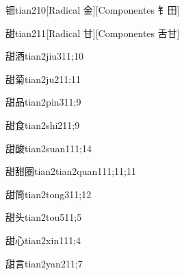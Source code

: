 \begin{verbete}{钿}{tian2}{10}[Radical 金][Componentes ⻐田]
\end{verbete}

\begin{verbete}{甜}{tian2}{11}[Radical 甘][Componentes 舌甘]
\end{verbete}

\begin{verbete}{甜酒}{tian2jiu3}{11;10}
\end{verbete}

\begin{verbete}{甜菊}{tian2ju2}{11;11}
\end{verbete}

\begin{verbete}{甜品}{tian2pin3}{11;9}
\end{verbete}

\begin{verbete}{甜食}{tian2shi2}{11;9}
\end{verbete}

\begin{verbete}{甜酸}{tian2suan1}{11;14}
\end{verbete}

\begin{verbete}{甜甜圈}{tian2tian2quan1}{11;11;11}
\end{verbete}

\begin{verbete}{甜筒}{tian2tong3}{11;12}
\end{verbete}

\begin{verbete}{甜头}{tian2tou5}{11;5}
\end{verbete}

\begin{verbete}{甜心}{tian2xin1}{11;4}
\end{verbete}

\begin{verbete}{甜言}{tian2yan2}{11;7}
\end{verbete}


